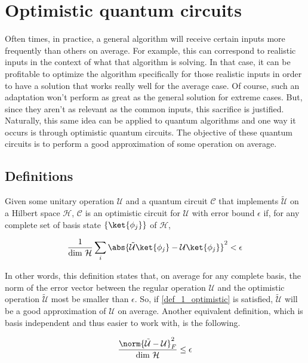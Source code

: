 \newpage
\section{Optimistic quantum circuits}
Often times, in practice, a general algorithm will receive certain inputs more frequently than others on average. For example, this can correspond to realistic inputs in the context of what that algorithm is solving. In that case, it can be profitable to optimize the algorithm specifically for those realistic inputs in order to have a solution that works really well for the average case. Of course, such an adaptation won't perform as great as the general solution for extreme cases. But, since they aren't as relevant as the common inputs, this sacrifice is justified. Naturally, this same idea can be applied to quantum algorithms and one way it occurs is through optimistic quantum circuits. The objective of these quantum circuits is to perform a good approximation of some operation on average.   

\subsection{Definitions}
Given some unitary operation $\mathcal{U}$ and a quantum circuit $\mathcal{C}$ that implements $\tilde{\mathcal{U}}$ on a Hilbert space $\mathcal{H}$, $\mathcal{C}$ is an optimistic circuit for $\mathcal{U}$ with error bound $\epsilon$ if, for any complete set of basis state $\left\{\ket{\phi_j}\right\}$ of $\mathcal{H}$,

\begin{equation}
    \frac{1}{\text{dim } \mathcal{H}}\sum_{i}\abs{\tilde{\mathcal{U}}\ket{\phi_j} - \mathcal{U}\ket{\phi_j}}^2 < \epsilon
    \label{def_1_optimistic}
\end{equation}

In other words, this definition states that, on average for any complete basis, the norm of the error vector between the regular operation $\mathcal{U}$ and the optimistic operation $\tilde{\mathcal{U}}$ most be smaller than $\epsilon$. So, if \ref{def_1_optimistic} is satisfied, $\tilde{\mathcal{U}}$ will be a good approximation of $\mathcal{U}$ on average. Another equivalent definition, which is basis independent and thus easier to work with, is the following.

\begin{equation}
    \frac{\norm{\tilde{\mathcal{U}}- \mathcal{U}}^2_F}{\text{dim } \mathcal{H}} \leq \epsilon
    \label{def_2_optimistic}
\end{equation}

